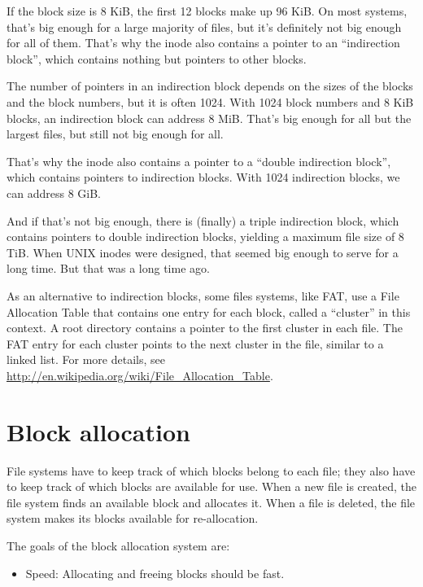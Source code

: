 \documentclass[12pt]{book}
\begin{document}
{If the block size is 8 KiB, the first 12 blocks make up 96 KiB.
On most systems, that's big enough for a large majority of files,
but it's definitely not big enough for all of them.  That's
why the inode also contains a pointer to an ``indirection block'',
which contains nothing but pointers to other blocks.

The number of pointers in an indirection block depends on the sizes of
the blocks and the block numbers, but it is often 1024.  With 1024
block numbers and 8 KiB blocks, an indirection block can address 8
MiB.  That's big enough for all but the largest files, but still not
big enough for all.

That's why the inode also contains a pointer to a ``double indirection
block'', which contains pointers to indirection blocks.  With
1024 indirection blocks, we can address 8 GiB.

And if that's not big enough, there is (finally) a triple indirection
block, which contains pointers to double indirection blocks, yielding
a maximum file size of 8 TiB.  When UNIX inodes were designed, that
seemed big enough to serve for a long time.  But that was a long time
ago.

As an alternative to indirection blocks, some files systems, like FAT,
use a File Allocation Table that contains one entry for each block,
called a ``cluster'' in this context.  A root directory contains a
pointer to the first cluster in each file.  The FAT entry for each
cluster points to the next cluster in the file, similar to a linked
list.  For more details, see
\url{http://en.wikipedia.org/wiki/File_Allocation_Table}.


\section{Block allocation}

File systems have to keep track of which blocks belong to each file;
they also have to keep track of which blocks are available for use.
When a new file is created, the file system finds an available
block and allocates it.  When a file is deleted, the file system
makes its blocks available for re-allocation.

The goals of the block allocation system are:

\begin{itemize}

\item Speed: Allocating and freeing blocks should be fast.


\end{itemize}}
\end{document}
